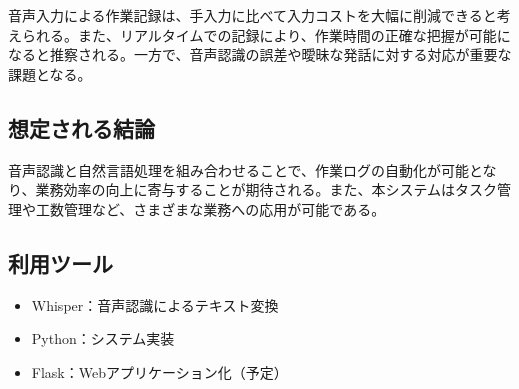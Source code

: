 \documentclass[a4paper,12pt,ja=standard,lualatex]{bxjsarticle}
\begin{document}
音声入力による作業記録は、手入力に比べて入力コストを大幅に削減できると考えられる。また、リアルタイムでの記録により、作業時間の正確な把握が可能になると推察される。一方で、音声認識の誤差や曖昧な発話に対する対応が重要な課題となる。

\subsection{想定される結論}

音声認識と自然言語処理を組み合わせることで、作業ログの自動化が可能となり、業務効率の向上に寄与することが期待される。また、本システムはタスク管理や工数管理など、さまざまな業務への応用が可能である。

\subsection{利用ツール}
\begin{itemize}
    \item Whisper：音声認識によるテキスト変換
    \item Python：システム実装
    \item Flask：Webアプリケーション化（予定）
\end{itemize}



\end{document}
